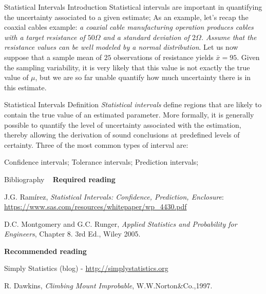 \documentclass[t]{beamer}
\begin{document}

\begin{ftst}
{Statistical Intervals}
{Introduction}
Statistical intervals are important in quantifying the uncertainty associated to a given estimate;
\vone
As an example, let's recap the coaxial cables example: \textit{a coaxial cable manufacturing operation produces cables with a target resistance of $50\Omega$ and a standard deviation of $2\Omega$. Assume that the resistance values can be well modeled by a normal distribution}.
\vone
Let us now suppose that a sample mean of $25$ observations of resistance  yields $\bar{x} = 95$. Given the sampling variability, it is very likely that this value is not exactly the true value of $\mu$, but we are so far unable quantify how much uncertainty there is in this estimate.
\end{ftst}


\begin{ftst}
{Statistical Intervals}
{Definition}
\textit{Statistical intervals} define regions that are likely to contain the true value of an estimated parameter. 
\vone
More formally, it is generally possible to quantify the level of uncertainty associated with the estimation, thereby allowing the derivation of sound conclusions at predefined levels of certainty.
\vone
Three of the most common types of interval are:

\bitems Confidence intervals;
	\spitem Tolerance intervals;
	\spitem Prediction intervals;
\eitem
\end{ftst}





\begin{ftst}
{Bibliography}
{\ }
\scriptsize
\textbf{Required reading}

\benums J.G. Ram\'irez, \textit{Statistical Intervals: Confidence, Prediction, Enclosure}: \url{https://www.sas.com/resources/whitepaper/wp_4430.pdf}
\item D.C. Montgomery and G.C. Runger, \textit{Applied Statistics and Probability for Engineers}, Chapter 8. 3rd Ed., Wiley 2005.
\eenum

\textbf{Recommended reading}

\benums Simply Statistics (blog) - \url{http://simplystatistics.org}
\item R. Dawkins, \textit{Climbing Mount Improbable}, W.W.Norton\&Co.,1997.
\eenum
\end{ftst}
\end{document}
